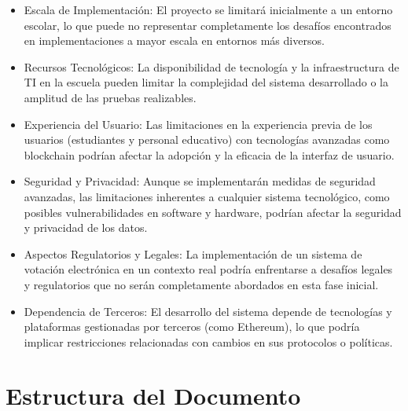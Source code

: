 \documentclass{report}
\begin{document}
	\begin{itemize}
		\item Escala de Implementación: El proyecto se limitará inicialmente a un entorno escolar, lo que puede no representar completamente los desafíos encontrados en implementaciones a mayor escala en entornos más diversos.
		\item Recursos Tecnológicos: La disponibilidad de tecnología y la infraestructura de TI en la escuela pueden limitar la complejidad del sistema desarrollado o la amplitud de las pruebas realizables.
		\item Experiencia del Usuario: Las limitaciones en la experiencia previa de los usuarios (estudiantes y personal educativo) con tecnologías avanzadas como blockchain podrían afectar la adopción y la eficacia de la interfaz de usuario.
		\item Seguridad y Privacidad: Aunque se implementarán medidas de seguridad avanzadas, las limitaciones inherentes a cualquier sistema tecnológico, como posibles vulnerabilidades en software y hardware, podrían afectar la seguridad y privacidad de los datos.
		\item Aspectos Regulatorios y Legales: La implementación de un sistema de votación electrónica en un contexto real podría enfrentarse a desafíos legales y regulatorios que no serán completamente abordados en esta fase inicial.
		\item Dependencia de Terceros: El desarrollo del sistema depende de tecnologías y plataformas gestionadas por terceros (como Ethereum), lo que podría implicar restricciones relacionadas con cambios en sus protocolos o políticas.
	\end{itemize}
	
	\section{Estructura del Documento}
	
\end{document}
